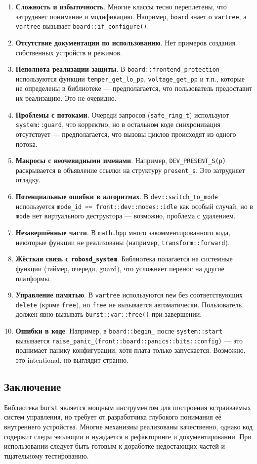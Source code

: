 \documentclass[a4paper,12pt]{article}
\begin{document}
\begin{enumerate}
    \item \textbf{Сложность и избыточность}. Многие классы тесно переплетены, что затрудняет понимание и модификацию. Например, \texttt{board} знает о \texttt{vartree}, а \texttt{vartree} вызывает \texttt{board::if\_configure()}.
    \item \textbf{Отсутствие документации по использованию}. Нет примеров создания собственных устройств и режимов.
    \item \textbf{Неполнота реализации защиты}. В \texttt{board::frontend\_protection\_} используются функции \texttt{temper\_get\_lo\_pp}, \texttt{voltage\_get\_pp} и т.п., которые не определены в библиотеке — предполагается, что пользователь предоставит их реализацию. Это не очевидно.
    \item \textbf{Проблемы с потоками}. Очереди запросов (\texttt{safe\_ring\_t}) используют \texttt{system::guard}, что корректно, но в остальном коде синхронизация отсутствует — предполагается, что вызовы циклов происходят из одного потока.
    \item \textbf{Макросы с неочевидными именами}. Например, \texttt{DEV\_PRESENT\_S(p)} раскрывается в объявление ссылки на структуру \texttt{present\_s}. Это затрудняет отладку.
    \item \textbf{Потенциальные ошибки в алгоритмах}. В \texttt{dev::switch\_to\_mode} используется \texttt{mode\_id == front::dev::modes::idle} как особый случай, но в \texttt{mode} нет виртуального деструктора — возможно, проблема с удалением.
    \item \textbf{Незавершённые части}. В \texttt{math.hpp} много закомментированного кода, некоторые функции не реализованы (например, \texttt{transform::forward}).
    \item \textbf{Жёсткая связь с \texttt{robosd\_system}}. Библиотека полагается на системные функции (таймер, очереди, guard), что усложняет перенос на другие платформы.
    \item \textbf{Управление памятью}. В \texttt{vartree} используются \texttt{new} без соответствующих \texttt{delete} (кроме \texttt{free}), но \texttt{free} не вызывается автоматически. Пользователь должен явно вызывать \texttt{burst::var::free()} при завершении.
    \item \textbf{Ошибки в коде}. Например, в \texttt{board::begin\_} после \texttt{system::start} вызывается \texttt{raise\_panic\_(front::board::panics::bits::config)} — это поднимает панику конфигурации, хотя плата только запускается. Возможно, это intentional, но выглядит странно.
\end{enumerate}

\subsection{Заключение}

Библиотека \texttt{burst} является мощным инструментом для построения встраиваемых систем управления, но требует от разработчика глубокого понимания её внутреннего устройства. Многие механизмы реализованы качественно, однако код содержит следы эволюции и нуждается в рефакторинге и документировании. При использовании следует быть готовым к доработке недостающих частей и тщательному тестированию.
\end{document}
